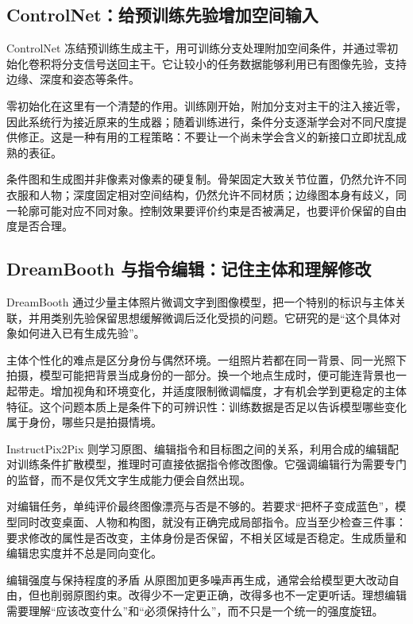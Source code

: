 \subsection{ControlNet：给预训练先验增加空间输入}

ControlNet 冻结预训练生成主干，用可训练分支处理附加空间条件，并通过零初始化卷积将分支信号送回主干。它让较小的任务数据能够利用已有图像先验，支持边缘、深度和姿态等条件。\cite{a_controlnet}

零初始化在这里有一个清楚的作用。训练刚开始，附加分支对主干的注入接近零，因此系统行为接近原来的生成器；随着训练进行，条件分支逐渐学会对不同尺度提供修正。这是一种有用的工程策略：不要让一个尚未学会含义的新接口立即扰乱成熟的表征。

条件图和生成图并非像素对像素的硬复制。骨架固定大致关节位置，仍然允许不同衣服和人物；深度固定相对空间结构，仍然允许不同材质；边缘图本身有歧义，同一轮廓可能对应不同对象。控制效果要评价约束是否被满足，也要评价保留的自由度是否合理。

\subsection{DreamBooth 与指令编辑：记住主体和理解修改}

DreamBooth 通过少量主体照片微调文字到图像模型，把一个特别的标识与主体关联，并用类别先验保留思想缓解微调后泛化受损的问题。它研究的是“这个具体对象如何进入已有生成先验”。\cite{a_dreambooth}

主体个性化的难点是区分身份与偶然环境。一组照片若都在同一背景、同一光照下拍摄，模型可能把背景当成身份的一部分。换一个地点生成时，便可能连背景也一起带走。增加视角和环境变化，并适度限制微调幅度，才有机会学到更稳定的主体特征。这个问题本质上是条件下的可辨识性：训练数据是否足以告诉模型哪些变化属于身份，哪些只是拍摄情境。

InstructPix2Pix 则学习原图、编辑指令和目标图之间的关系，利用合成的编辑配对训练条件扩散模型，推理时可直接依据指令修改图像。它强调编辑行为需要专门的监督，而不是仅凭文字生成能力便会自然出现。\cite{a_instructpix}

对编辑任务，单纯评价最终图像漂亮与否是不够的。若要求“把杯子变成蓝色”，模型同时改变桌面、人物和构图，就没有正确完成局部指令。应当至少检查三件事：要求修改的属性是否改变，主体身份是否保留，不相关区域是否稳定。生成质量和编辑忠实度并不总是同向变化。

\begin{cautionbox}{编辑强度与保持程度的矛盾}
从原图加更多噪声再生成，通常会给模型更大改动自由，但也削弱原图约束。改得少不一定更正确，改得多也不一定更听话。理想编辑需要理解“应该改变什么”和“必须保持什么”，而不只是一个统一的强度旋钮。
\end{cautionbox}

